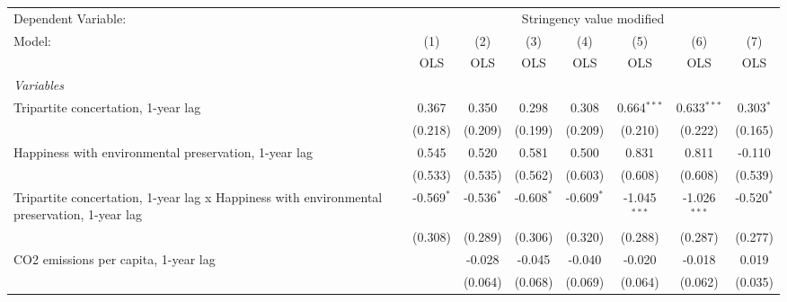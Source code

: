 
\begingroup
\centering
\begin{tabular}{lccccccc}
   \toprule
   Dependent Variable: & \multicolumn{7}{c}{Stringency value modified}\\
   Model:                                                                                      & (1)          & (2)          & (3)           & (4)           & (5)            & (6)            & (7)\\  
                                                                                               &  OLS         & OLS          & OLS           & OLS           & OLS            & OLS            & OLS\\  
   \midrule
   \emph{Variables}\\
   Tripartite concertation, 1-year lag                                                         & 0.367        & 0.350        & 0.298         & 0.308         & 0.664$^{***}$  & 0.633$^{***}$  & 0.303$^{*}$\\   
                                                                                               & (0.218)      & (0.209)      & (0.199)       & (0.209)       & (0.210)        & (0.222)        & (0.165)\\   
   Happiness with environmental preservation, 1-year lag                                       & 0.545        & 0.520        & 0.581         & 0.500         & 0.831          & 0.811          & -0.110\\   
                                                                                               & (0.533)      & (0.535)      & (0.562)       & (0.603)       & (0.608)        & (0.608)        & (0.539)\\   
   Tripartite concertation, 1-year lag x Happiness with environmental preservation, 1-year lag & -0.569$^{*}$ & -0.536$^{*}$ & -0.608$^{*}$  & -0.609$^{*}$  & -1.045$^{***}$ & -1.026$^{***}$ & -0.520$^{*}$\\   
                                                                                               & (0.308)      & (0.289)      & (0.306)       & (0.320)       & (0.288)        & (0.287)        & (0.277)\\   
   CO2 emissions per capita, 1-year lag                                                        &              & -0.028       & -0.045        & -0.040        & -0.020         & -0.018         & 0.019\\   
                                                                                               &              & (0.064)      & (0.068)       & (0.069)       & (0.064)        & (0.062)        & (0.035)\\   

\end{tabular}

